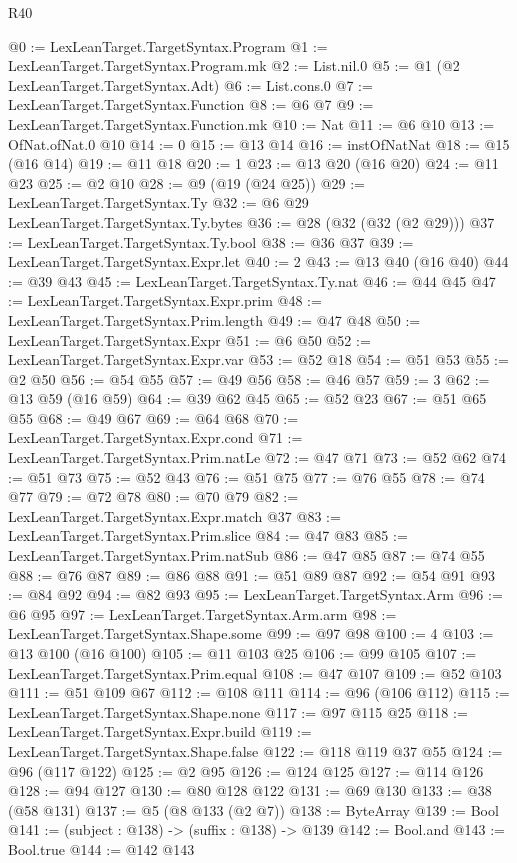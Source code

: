 \begin{lexlean}{R40}
\begin{coremodule}
{{{{{@0 := LexLeanTarget.TargetSyntax.Program
@1 := LexLeanTarget.TargetSyntax.Program.mk
@2 := List.nil.{0}
@5 := @1 (@2 LexLeanTarget.TargetSyntax.Adt)
@6 := List.cons.{0}
@7 := LexLeanTarget.TargetSyntax.Function
@8 := @6 @7
@9 := LexLeanTarget.TargetSyntax.Function.mk
@10 := Nat
@11 := @6 @10
@13 := OfNat.ofNat.{0} @10
@14 := 0
@15 := @13 @14
@16 := instOfNatNat
@18 := @15 (@16 @14)
@19 := @11 @18
@20 := 1
@23 := @13 @20 (@16 @20)
@24 := @11 @23
@25 := @2 @10
@28 := @9 (@19 (@24 @25))
@29 := LexLeanTarget.TargetSyntax.Ty
@32 := @6 @29 LexLeanTarget.TargetSyntax.Ty.bytes
@36 := @28 (@32 (@32 (@2 @29)))
@37 := LexLeanTarget.TargetSyntax.Ty.bool
@38 := @36 @37
@39 := LexLeanTarget.TargetSyntax.Expr.let
@40 := 2
@43 := @13 @40 (@16 @40)
@44 := @39 @43
@45 := LexLeanTarget.TargetSyntax.Ty.nat
@46 := @44 @45
@47 := LexLeanTarget.TargetSyntax.Expr.prim
@48 := LexLeanTarget.TargetSyntax.Prim.length
@49 := @47 @48
@50 := LexLeanTarget.TargetSyntax.Expr
@51 := @6 @50
@52 := LexLeanTarget.TargetSyntax.Expr.var
@53 := @52 @18
@54 := @51 @53
@55 := @2 @50
@56 := @54 @55
@57 := @49 @56
@58 := @46 @57
@59 := 3
@62 := @13 @59 (@16 @59)
@64 := @39 @62 @45
@65 := @52 @23
@67 := @51 @65 @55
@68 := @49 @67
@69 := @64 @68
@70 := LexLeanTarget.TargetSyntax.Expr.cond
@71 := LexLeanTarget.TargetSyntax.Prim.natLe
@72 := @47 @71
@73 := @52 @62
@74 := @51 @73
@75 := @52 @43
@76 := @51 @75
@77 := @76 @55
@78 := @74 @77
@79 := @72 @78
@80 := @70 @79
@82 := LexLeanTarget.TargetSyntax.Expr.match @37
@83 := LexLeanTarget.TargetSyntax.Prim.slice
@84 := @47 @83
@85 := LexLeanTarget.TargetSyntax.Prim.natSub
@86 := @47 @85
@87 := @74 @55
@88 := @76 @87
@89 := @86 @88
@91 := @51 @89 @87
@92 := @54 @91
@93 := @84 @92
@94 := @82 @93
@95 := LexLeanTarget.TargetSyntax.Arm
@96 := @6 @95
@97 := LexLeanTarget.TargetSyntax.Arm.arm
@98 := LexLeanTarget.TargetSyntax.Shape.some
@99 := @97 @98
@100 := 4
@103 := @13 @100 (@16 @100)
@105 := @11 @103 @25
@106 := @99 @105
@107 := LexLeanTarget.TargetSyntax.Prim.equal
@108 := @47 @107
@109 := @52 @103
@111 := @51 @109 @67
@112 := @108 @111
@114 := @96 (@106 @112)
@115 := LexLeanTarget.TargetSyntax.Shape.none
@117 := @97 @115 @25
@118 := LexLeanTarget.TargetSyntax.Expr.build
@119 := LexLeanTarget.TargetSyntax.Shape.false
@122 := @118 @119 @37 @55
@124 := @96 (@117 @122)
@125 := @2 @95
@126 := @124 @125
@127 := @114 @126
@128 := @94 @127
@130 := @80 @128 @122
@131 := @69 @130
@133 := @38 (@58 @131)
@137 := @5 (@8 @133 (@2 @7))
@138 := ByteArray
@139 := Bool
@141 := (subject : @138) -> (suffix : @138) -> @139
@142 := Bool.and
@143 := Bool.true
@144 := @142 @143
}}}}}
\end{coremodule}
\end{lexlean}
